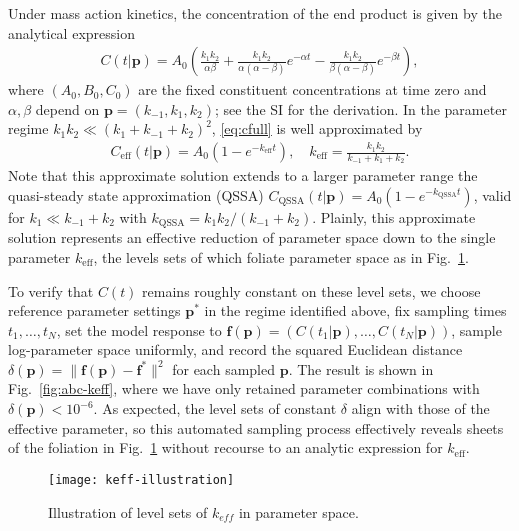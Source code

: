 % 
Under mass action kinetics, the concentration of the end product is
given by the analytical expression
% 
\begin{align}
  C(t|\mathbf{p})
  =
  A_0
  \left(
  \frac{k_1 k_2}{\alpha \beta}
  +
  \frac{k_1 k_2}{\alpha(\alpha - \beta)}
  e^{-\alpha t}
  -
  \frac{k_1 k_2}{\beta(\alpha - \beta)}
  e^{-\beta t}
  \right) ,
  \label{eq:cfull}
\end{align}
% 
where $(A_0,B_0,C_0)$ are the fixed constituent concentrations at time
zero and $\alpha,\beta$ depend on $\mathbf{p}=(k_{-1},k_1,k_2)$; see
the SI for the derivation.  In the parameter regime
$k_1 k_2 \ll (k_1 + k_{-1} + k_2)^2$, \eqref{eq:cfull} is well
approximated by
% 
\begin{align}
  C_\mathrm{eff}(t|\mathbf{p})
  =
  A_0
  \left(
  1 - e^{-k_\mathrm{eff} t}
  \right) ,
  \quad
  k_\mathrm{eff}
  =
  \frac{k_1 k_2}{k_{-1} + k_1 + k_2} .
  \label{ABC-QSSA}
\end{align}
% 
Note that this approximate solution extends to a larger parameter
range the quasi-steady state approximation (QSSA)
$C_\mathrm{QSSA}(t|\mathbf{p}) = A_0 (1 - e^{-k_\mathrm{QSSA} t})$,
valid for $k_1 \ll k_{-1} + k_2$ with
$k_\mathrm{QSSA}=k_1 k_2/(k_{-1} + k_2)$.  Plainly, this approximate
solution represents an effective reduction of parameter space down to
the single parameter $k_\mathrm{eff}$, the levels sets of which
foliate parameter space as in Fig.~\ref{fig:dmitri}.

To verify that $C(t)$ remains roughly constant on these level sets, we
choose reference parameter settings $\mathbf{p}^*$ in the regime
identified above, fix sampling times $t_1,\ldots,t_N$, set the model
response to
$\mathbf{f}(\mathbf{p})=( C(t_1|\mathbf{p}) , \ldots ,
C(t_N|\mathbf{p}) )$, sample log-parameter space uniformly, and record
the squared Euclidean distance
$\delta(\mathbf{p}) = \| \mathbf{f}(\mathbf{p}) - \mathbf{f}^* \|^2$
for each sampled $\mathbf{p}$.  The result is shown in
Fig.~\ref{fig:abc-keff}, where we have only retained parameter
combinations with $\delta(\mathbf{p}) < 10^{-6}$.  As expected, the
level sets of constant $\delta$ align with those of the effective
parameter, so this automated sampling process effectively reveals
sheets of the foliation in Fig.~\ref{fig:dmitri} without recourse to
an analytic expression for $k_\mathrm{eff}$.

\begin{figure}[ht!]
  \centering
  \texttt{[image: keff-illustration]}
  \caption[Illustration of level sets of the effective parameter in a
  model of chemical kinetics]{Illustration of level sets of $k_{eff}$
    in parameter space. \label{fig:dmitri} }
\end{figure}

